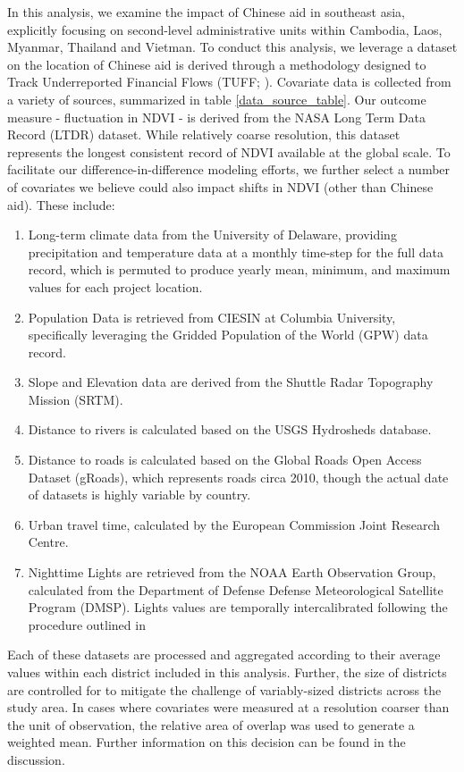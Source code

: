 In this analysis, we examine the impact of Chinese aid in southeast asia, explicitly focusing on second-level administrative units within Cambodia, Laos, Myanmar, Thailand and Vietman.
To conduct this analysis, we leverage a dataset on the location of Chinese aid is derived through a methodology designed to Track Underreported Financial Flows (TUFF; \cite{strange_tracking_2015}).
Covariate data is collected from a variety of sources, summarized in table \ref{data_source_table}.
Our outcome measure - fluctuation in NDVI - is derived from the NASA Long Term Data Record (LTDR) dataset.
While relatively coarse resolution, this dataset represents the longest consistent record of NDVI available at the global scale.
To facilitate our difference-in-difference modeling efforts, we further select a number of covariates we believe could also impact shifts in NDVI (other than Chinese aid).
These include:
\begin{enumerate}
\item{Long-term climate data from the University of Delaware, providing precipitation and temperature data at a monthly time-step for the full data record, which is permuted to produce yearly mean, minimum, and maximum values for each project location.}
\item{Population Data is retrieved from CIESIN at Columbia University, specifically leveraging the Gridded Population of the World (GPW) data record.}
\item{Slope and Elevation data are derived from the Shuttle Radar Topography Mission (SRTM).}
\item{Distance to rivers is calculated based on the USGS Hydrosheds database.}
\item{Distance to roads is calculated based on the Global Roads Open Access Dataset (gRoads), which represents roads circa 2010, though the actual date of datasets is highly variable by country.}
\item{Urban travel time, calculated by the European Commission Joint Research Centre.}
\item{Nighttime Lights are retrieved from the NOAA Earth Observation Group, calculated from the Department of Defense Defense Meteorological Satellite Program (DMSP).  Lights values are temporally intercalibrated following the procedure outlined in \cite{weng_global_2014}}
\end{enumerate}
Each of these datasets are processed and aggregated according to their average values within each district included in this analysis.  
Further, the size of districts are controlled for to mitigate the challenge of variably-sized districts across the study area.
In cases where covariates were measured at a resolution coarser than the unit of observation, the relative area of overlap was used to generate a weighted mean.
Further information on this decision can be found in the discussion.









